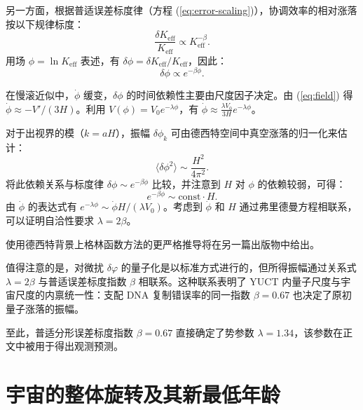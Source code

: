 \documentclass[11pt,a4paper]{article}
\newcommand{\Keff}{K_{\mathrm{eff}}}
\begin{document}
	另一方面，根据普适误差标度律（方程 (\ref{eq:error-scaling})），协调效率的相对涨落按以下规律标度：
	\begin{equation}
		\frac{\delta\Keff}{\Keff} \propto \Keff^{-\beta}.
	\end{equation}
	用场 \(\phi = \ln\Keff\) 表述，有 \(\delta\phi = \delta\Keff/\Keff\)，因此：
	\begin{equation}
		\delta\phi \propto e^{-\beta\phi}.
	\end{equation}
	
	在慢滚近似中，\(\dot{\phi}\) 缓变，\(\delta\phi\) 的时间依赖性主要由尺度因子决定。由 (\ref{eq:field}) 得 \(\dot{\phi} \approx -V'/(3H)\)。利用 \(V(\phi) = V_0 e^{-\lambda\phi}\)，有 \(\dot{\phi} \approx \frac{\lambda V_0}{3H} e^{-\lambda\phi}\)。
	
	对于出视界的模（\(k = aH\)），振幅 \(\delta\phi_k\) 可由德西特空间中真空涨落的归一化来估计：
	\begin{equation}
		\langle \delta\phi^2 \rangle \sim \frac{H^2}{4\pi^2}.
	\end{equation}
	将此依赖关系与标度律 \(\delta\phi \sim e^{-\beta\phi}\) 比较，并注意到 \(H\) 对 \(\phi\) 的依赖较弱，可得：
	\begin{equation}
		e^{-\beta\phi} \sim \text{const} \cdot H.
	\end{equation}
	由 \(\dot{\phi}\) 的表达式有 \(e^{-\lambda\phi} \sim \dot{\phi} H / (\lambda V_0)\)。考虑到 \(\dot{\phi}\) 和 \(H\) 通过弗里德曼方程相联系，可以证明自洽性要求 \(\lambda = 2\beta\)。
	
	使用德西特背景上格林函数方法的更严格推导将在另一篇出版物中给出。
	
	值得注意的是，对微扰 \(\delta\varphi\) 的量子化是以标准方式进行的，但所得振幅通过关系式 \(\lambda = 2\beta\) 与普适误差标度指数 \(\beta\) 相联系。这种联系表明了 YUCT 内量子尺度与宇宙尺度的内禀统一性：支配 DNA 复制错误率的同一指数 \(\beta = 0.67\) 也决定了原初量子涨落的振幅。
	
	至此，普适分形误差标度指数 \(\beta = 0.67\) 直接确定了势参数 \(\lambda = 1.34\)，该参数在正文中被用于得出观测预测。
	
	\part{宇宙的整体旋转及其新最低年龄}
	\label{part:IV}
	
\end{document}
